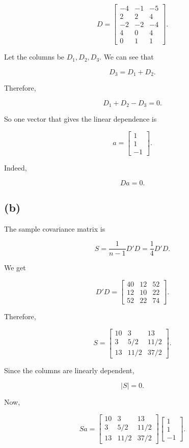 \documentclass[12pt]{article}
\begin{document}
$$
\boxed{
D=
\begin{bmatrix}
-4&-1&-5\\
2&2&4\\
-2&-2&-4\\
4&0&4\\
0&1&1
\end{bmatrix}}.
$$

Let the columns be $D_1,D_2,D_3$. We can see that

$$
D_3=D_1+D_2.
$$

Therefore,

$$
D_1+D_2-D_3=0.
$$

So one vector that gives the linear dependence is

$$
\boxed{
a=
\begin{bmatrix}
1\\1\\-1
\end{bmatrix}}.
$$

Indeed,

$$
Da=0.
$$

\subsection*{(b)}

The sample covariance matrix is

$$
S=\frac{1}{n-1}D'D
=\frac14D'D.
$$

We get

$$
D'D=
\begin{bmatrix}
40&12&52\\
12&10&22\\
52&22&74
\end{bmatrix}.
$$

Therefore,

$$
\boxed{
S=
\begin{bmatrix}
10&3&13\\
3&5/2&11/2\\
13&11/2&37/2
\end{bmatrix}}.
$$

Since the columns are linearly dependent,

$$
\boxed{|S|=0}.
$$

Now,

$$
Sa=
\begin{bmatrix}
10&3&13\\
3&5/2&11/2\\
13&11/2&37/2
\end{bmatrix}
\begin{bmatrix}
1\\1\\-1
\end{bmatrix}.
$$
\end{document}
